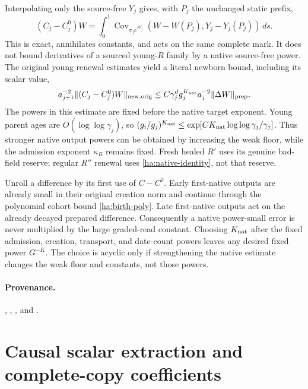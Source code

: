 Interpolating only the source-free $Y_j$ gives, with $P_j$ the unchanged
static prefix,
\begin{equation}
 (C_j-C_j^0)W=\int_0^1
       \operatorname{Cov}_{\sigma_je^{sY_j}}
       (W-W(P_j),Y_j-Y_j(P_j))\,ds.
 \label{ha:native-identity}
\end{equation}
This is exact, annihilates constants, and acts on the same complete mark.
It does not bound derivatives of a sourced young-$R$ family by a native
source-free power.  The original young renewal estimates yield a literal
newborn bound, including its scalar value,
\begin{equation}
 a_{j+1}^{-2}\|(C_j-C_j^0)W\|_{\rm new,orig}
 \leq C\gamma_j^{d}g_j^{K_{\rm nat}}
                     a_j^{-2}\|\Delta W\|_{\rm prep}.
 \label{ha:native-newborn}
\end{equation}
The powers in this estimate are fixed before the native target exponent.
Young parent ages are $O(\log\log\gamma_j)$, so
$(g_i/g_j)^{K_{\rm nat}}\leq
\exp[CK_{\rm nat}\log\log\gamma_j/\gamma_j]$.
Thus stronger native output powers can be obtained by increasing the
weak floor, while the admission exponent $\kappa_R$ remains fixed.
Fresh healed $R'$ uses its genuine bad-field reserve; regular $R''$
renewal uses \eqref{ha:native-identity}, not that reserve.

Unroll a difference by its first use of $C-C^0$.  Early first-native
outputs are already small in their original creation norm and continue
through the polynomial cohort bound \eqref{ha:birth-poly}.  Late
first-native outputs act on the already decayed prepared difference.
Consequently a native power-small error is never multiplied by the
large graded-read constant.  Choosing $K_{\rm nat}$ after the fixed
admission, creation, transport, and date-count powers leaves any desired
fixed power $G^{-K}$.  The choice is acyclic only if strengthening the
native estimate changes the weak floor and constants, not those powers.

\paragraph{Provenance.}
,
,
,
and .

\section{Causal scalar extraction and complete-copy coefficients}
\label{ha:scalars}


